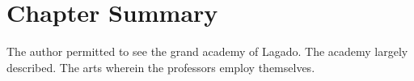 				
\section{Chapter Summary}

The author permitted to see the grand academy of Lagado.  The academy largely described.  The arts wherein the professors employ themselves.

\pagebreak


